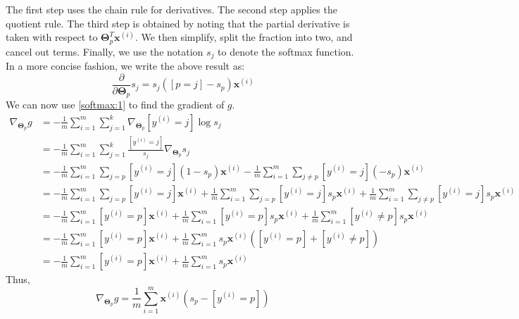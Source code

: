 \documentclass{article}
\begin{document}
The first step uses the chain rule for derivatives. The second step applies the quotient rule. The third step is obtained by noting that the partial derivative is taken with respect to $\boldsymbol\Theta_p^T \textbf{x}^{(i)}$. We then simplify, split the fraction into two, and cancel out terms. Finally, we use the notation $s_j$ to denote the softmax function. In a more concise fashion, we write the above result as:
\begin{equation}
    \frac{\partial}{\partial \boldsymbol\Theta_p} s_j = s_j([p=j]-s_p)\textbf{x}^{(i)} \label{softmax:1}
\end{equation}
We can now use \eqref{softmax:1} to find the gradient of $g$.
\[
    \begin{aligned}
        \nabla_{\boldsymbol\Theta_p} g &= -\frac{1}{m} \sum\limits_{i=1}^m \sum\limits_{j=1}^k \nabla_{\boldsymbol\Theta_p} [y^{(i)}=j]\log s_j \\
        &= -\frac{1}{m} \sum\limits_{i=1}^m \sum\limits_{j=1}^k \frac{[y^{(i)}=j]}{s_j} \nabla_{\boldsymbol\Theta_p} s_j \\
        &= -\frac{1}{m} \sum\limits_{i=1}^m \sum\limits_{j=p} [y^{(i)}=j] (1-s_p)\textbf{x}^{(i)} - \frac{1}{m} \sum\limits_{i=1}^m \sum\limits_{j \neq p} [y^{(i)}=j](-s_p)\textbf{x}^{(i)} \\
        &= -\frac{1}{m} \sum\limits_{i=1}^m \sum\limits_{j=p} [y^{(i)}=j]\textbf{x}^{(i)} + \frac{1}{m} \sum\limits_{i=1}^m \sum\limits_{j=p} [y^{(i)}=j]s_p \textbf{x}^{(i)} + \frac{1}{m} \sum\limits_{i=1}^m \sum\limits_{j \neq p} [y^{(i)}=j]s_p \textbf{x}^{(i)} \\
        &= -\frac{1}{m} \sum\limits_{i=1}^m [y^{(i)}=p]\textbf{x}^{(i)} + \frac{1}{m} \sum\limits_{i=1}^m [y^{(i)}=p]s_p \textbf{x}^{(i)} + \frac{1}{m} \sum\limits_{i=1}^m [y^{(i)} \neq p] s_p \textbf{x}^{(i)} \\
        &= -\frac{1}{m} \sum\limits_{i=1}^m [y^{(i)}=p]\textbf{x}^{(i)} + \frac{1}{m} \sum\limits_{i=1}^m s_p \textbf{x}^{(i)} \left( [y^{(i)}=p] + [y^{(i)} \neq p] \right) \\
        &= -\frac{1}{m} \sum\limits_{i=1}^m [y^{(i)}=p]\textbf{x}^{(i)} + \frac{1}{m} \sum\limits_{i=1}^m s_p \textbf{x}^{(i)}
    \end{aligned}
\]
Thus,
\begin{equation}
    \nabla_{\boldsymbol\Theta_p} g = \frac{1}{m} \sum\limits_{i=1}^m \textbf{x}^{(i)} \left(s_p - [y^{(i)}=p] \right) \label{softmax:2}
\end{equation}
\end{document}

